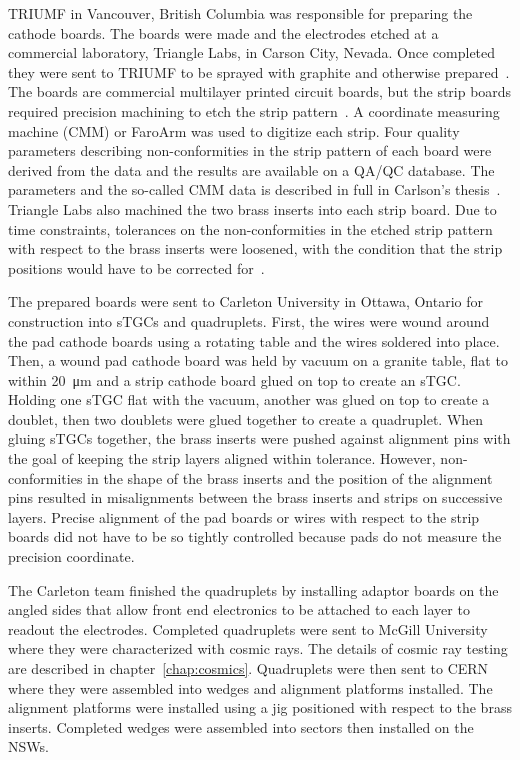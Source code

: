 TRIUMF in Vancouver, British Columbia was responsible for preparing the cathode boards. The boards were made and the electrodes etched at a commercial laboratory, Triangle Labs, in Carson City, Nevada. Once completed they were sent to TRIUMF to be sprayed with graphite and otherwise prepared~\cite{carlson_results_2019}. The boards are commercial multilayer printed circuit boards, but the strip boards required precision machining to etch the strip pattern~\cite{nsw_tdr}. A coordinate measuring machine (CMM) or FaroArm was used to digitize each strip. Four quality parameters describing non-conformities in the strip pattern of each board were derived from the data and the results are available on a QA/QC database. The parameters and the so-called CMM data is described in full in Carlson's thesis~\cite{carlson_results_2019}. Triangle Labs also machined the two brass inserts into each strip board. Due to time constraints, tolerances on the non-conformities in the etched strip pattern with respect to the brass inserts were loosened, with the condition that the strip positions would have to be corrected for~\cite{carlson_results_2019}. 

The prepared boards were sent to Carleton University in Ottawa, Ontario for construction into sTGCs and quadruplets. First, the wires were wound around the pad cathode boards using a rotating table and the wires soldered into place. Then, a wound pad cathode board was held by vacuum on a granite table, flat to within \SI{20}{\micro\meter} and a strip cathode board glued on top to create an sTGC. Holding one sTGC flat with the vacuum, another was glued on top to create a doublet, then two doublets were glued together to create a quadruplet. When gluing sTGCs together, the brass inserts were pushed against alignment pins with the goal of keeping the strip layers aligned within tolerance. However, non-conformities in the shape of the brass inserts and the position of the alignment pins resulted in misalignments between the brass inserts and strips on successive layers. Precise alignment of the pad boards or wires with respect to the strip boards did not have to be so tightly controlled because pads do not measure the precision coordinate. 

The Carleton team finished the quadruplets by installing adaptor boards on the angled sides that allow front end electronics to be attached to each layer to readout the electrodes. Completed quadruplets were sent to McGill University where they were characterized with cosmic rays. The details of cosmic ray testing are described in chapter~\ref{chap:cosmics}. Quadruplets were then sent to CERN where they were assembled into wedges and alignment platforms installed. The alignment platforms were installed using a jig positioned with respect to the brass inserts. Completed wedges were assembled into sectors then installed on the NSWs.

